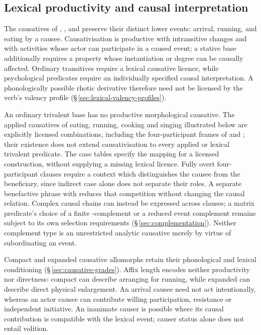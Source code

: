 \subsection{Lexical productivity and causal interpretation}
\label{sec:causative-productivity}

The causatives of  ,  ,
and   preserve their distinct lower events: arrival,
running, and eating by a causee. Causativisation is productive with
intransitive changes and with activities whose actor can participate in a
caused event; a stative base additionally requires a property whose
instantiation or degree can be causally affected. Ordinary transitives
require a lexical causative licence, while psychological predicates require
an individually specified causal interpretation. A phonologically possible
rhotic derivative therefore need not be licensed by the verb's valency
profile (§\,\ref{sec:lexical-valency-profiles}).

An ordinary trivalent base has no productive morphological causative.
The applied causatives of eating, running, cooking and singing illustrated
below are explicitly licensed combinations, including the four-participant
frames of  and ; their existence does not
extend causativisation to every applied or lexical trivalent predicate.
The case tables specify the mapping for a licensed construction, without
supplying a missing lexical licence. Fully overt four-participant clauses
require a context which distinguishes the causee from the beneficiary,
since indirect case alone does not separate their roles. A separate
benefactive phrase with  reduces that competition without changing
the causal relation. Complex causal chains can instead be expressed across
clauses; a matrix predicate's choice of a finite -complement or a
reduced event complement remains subject to its own selection requirements
(§\,\ref{sec:complementation}). Neither complement type is an unrestricted
analytic causative merely by virtue of subordinating an event.

Compact and expanded causative allomorphs retain their phonological and
lexical conditioning (§\,\ref{sec:causative-grades}). Affix length encodes
neither productivity nor directness: compact  can describe
arranging for running, while expanded  can describe direct
physical enlargement. An arrival causee need not act intentionally, whereas
an actor causee can contribute willing participation, resistance or
independent initiative. An inanimate causer is possible where its causal
contribution is compatible with the lexical event; causer status alone
does not entail volition.

